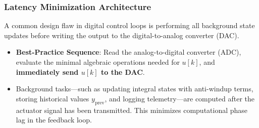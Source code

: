 \documentclass[12pt,onecolumn,twoside ]{article}
\begin{document}
	\subsubsection{Latency Minimization Architecture}
	A common design flaw in digital control loops is performing all background state updates before writing the output to the digital-to-analog converter (DAC).
	\begin{itemize}
		\item
		\textbf{Best-Practice Sequence}: Read the analog-to-digital converter (ADC), evaluate the minimal algebraic operations needed for $u[k]$, and \textbf{immediately send $u[k]$ to the DAC}.
		\item
		Background tasks—such as updating integral states with anti-windup terms, storing historical values $y_{\text{prev}}$, and logging telemetry—are computed after the actuator signal has been transmitted. This minimizes computational phase lag in the feedback loop.
	\end{itemize}
	
\end{document}
